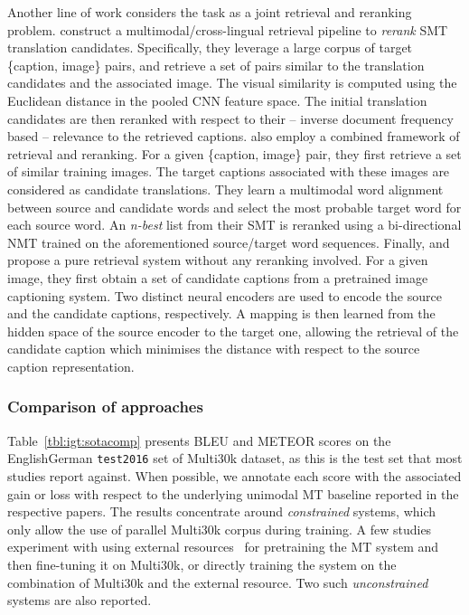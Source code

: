 \documentclass{svjour3}
\newcommand{\lp}[2]{#1#2}
\begin{document}
Another line of work considers the task as a joint retrieval and reranking problem. \citet{hitschler-2016-multimodal} construct a multimodal/cross-lingual retrieval pipeline to \textit{rerank} SMT translation candidates. Specifically, they leverage a large corpus of target \{caption, image\} pairs, and retrieve a set of pairs similar to the translation candidates and the associated image. The visual similarity is computed using the Euclidean distance in the pooled CNN feature space. The initial translation candidates are then reranked with respect to their  -- inverse document frequency based -- relevance to the retrieved captions.
\citet{zhang-EtAl:2017:WMT2} also employ a combined framework of retrieval and reranking.
For a given \{caption, image\} pair, they first retrieve a set of similar training images. The target captions associated with these images are considered as candidate translations. They learn a multimodal word alignment between source and candidate words
and select the most probable target word for each source word. An \textit{n-best} list 
from their SMT is reranked using a bi-directional NMT trained on the aforementioned source/target word sequences. Finally, \citet{duselis-EtAl:2017:WMT} and \citet{gwinnup-EtAl:2018:WMT2} propose a pure retrieval system without any reranking involved. For a given image, they first obtain a set of candidate captions from a pretrained image captioning system. Two distinct neural encoders are  used to encode the source and the candidate captions, respectively. A mapping is then learned from the hidden space of the source encoder to the target one, allowing the retrieval of the candidate caption which minimises the distance with respect to the source caption representation.







\subsubsection{Comparison of approaches}
\label{sec:tasks:ict:comp}
Table~\ref{tbl:igt:sotacomp} presents BLEU and METEOR scores on the \lp{English}{German} \texttt{test2016} set of Multi30k dataset, as this is the test set that most studies report against. When possible, we annotate each score with the associated gain or loss with respect to the underlying unimodal MT baseline reported in the respective papers. The results concentrate around \textit{constrained} systems, which only allow the use of parallel Multi30k corpus during training. A few studies experiment with using external resources~\citep{calixto-doubly-2017,helcl-libovicky:2017:WMT,elliott-imagination-2017,gronroos-memad-2018} for pretraining the MT system and then fine-tuning it on Multi30k, or directly training the system on the combination of Multi30k and the external resource. Two such \textit{unconstrained} systems are also reported.
\end{document}
